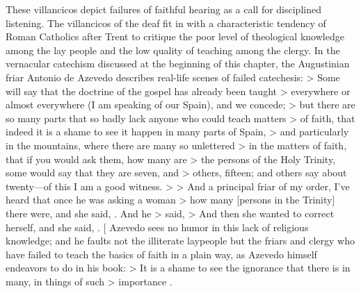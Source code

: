 These villancicos depict failures of faithful hearing as a call for disciplined listening.
The villancicos of the deaf fit in with a characteristic tendency of Roman Catholics after Trent to critique the poor level of theological knowledge among the lay people and the low quality of teaching among the clergy.
\Autocite[56--57]{Kamen:EarlyModernSociety}
In the vernacular catechism discussed at the beginning of this chapter, the Augustinian friar Antonio de Azevedo describes real-life scenes of failed catechesis:
> Some will say that the doctrine of the gospel has already been taught > everywhere or almost everywhere (I am speaking of our Spain), and we concede; > but there are so many parts that so badly lack anyone who could teach matters > of faith, that indeed it is a shame to see it happen in many parts of Spain, > and particularly in the mountains, where there are many so unlettered >  in the matters of faith, that if you would ask them, how many are > the persons of the Holy Trinity, some would say that they are seven, and > others, fifteen; and others say about twenty---of this I am a good witness.
> > And a principal friar of my order, I've heard that once he was asking a woman > how many [persons in the Trinity] there were, and she said, . And he > said,  > And then she wanted to correct herself, and she said, .
[\Autocite[26:  .]{Azevedo:Catecismo}
   Azevedo sees no humor in this lack of religious knowledge; and he faults not the illiterate laypeople but the friars and clergy who have failed to teach the basics of faith in a plain way, as Azevedo himself endeavors to do in his book:
> It is a shame to see the ignorance that there is in many, in things of such > importance \Dots{}.
